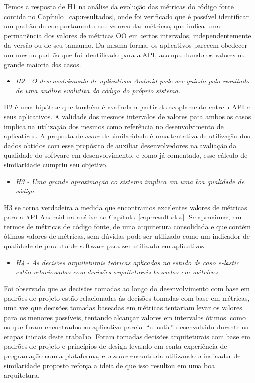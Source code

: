 Temos a resposta de H1 na análise da evolução das métricas do código fonte contida no Capítulo~\ref{cap:resultados}, onde foi verificado que é possível identificar um padrão de comportamento nos valores das métricas, que indica uma permanência dos valores de métricas OO em certos intervalos, independentemente da versão ou de seu tamanho. Da mesma forma, os aplicativos parecem obedecer um mesmo padrão que foi identificado para a API, acompanhando os valores na grande maioria dos casos.

\begin{itemize}
\item \textit{H2 - O desenvolvimento de aplicativos Android pode ser guiado pelo resultado de uma análise evolutiva do código do próprio sistema.}
\end{itemize}

H2 é uma hipótese que também é avaliada a partir do acoplamento entre a API e seus aplicativos. A validade dos mesmos intervalos de valores para ambos os casos implica na utilização dos mesmos como referência no desenvolvimento de aplicativos. A proposta de \textit{score} de similaridade é uma tentativa de utilização dos dados obtidos com esse propósito de auxiliar desenvolvedores na avaliação da qualidade do software em desenvolvimento, e como já comentado, esse cálculo de similaridade cumpriu seu objetivo.

\begin{itemize}
\item \textit{H3 - Uma grande aproximação ao sistema implica em uma boa qualidade de código.}
\end{itemize}

H3 se torna verdadeira a medida que encontramos excelentes valores de métricas para a API Android na análise no Capítulo~\ref{cap:resultados}. Se aproximar, em termos de métricas de código fonte, de uma arquitetura consolidada e que contém ótimos valores de métricas, sem dúvidas pode ser utilizado como um indicador de qualidade de produto de software para ser utilizado em aplicativos.

\begin{itemize}
\item \textit{H4 - As decisões arquiteturais teóricas aplicadas no estudo de caso e-lastic estão relacionadas com decisões arquiteturais baseadas em métricas.}
\end{itemize}

Foi observado que as decisões tomadas ao longo do desenvolvimento com base em padrões de projeto estão relacionadas às decisões tomadas com base em métricas, uma vez que decisões tomadas baseadas em métricas tentariam levar os valores para os menores possíveis, tentando alcançar valores em intervalos ótimos, como os que foram encontrados no aplicativo parcial ``e-lastic'' desenvolvido durante as etapas iniciais deste trabalho. Foram tomadas decisões arquiteturais com base em padrões de projeto e princípios de design levando em conta experiência de programação com a plataforma, e o \textit{score} encontrado utilizando o indicador de similaridade proposto reforça a ideia de que isso resultou em uma boa arquitetura.

